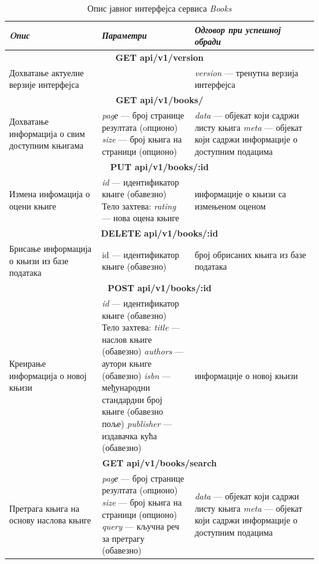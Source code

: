 \documentclass[12pt,oneside]{memoir}
\begin{document}
\begin{table}
\caption{Опис јавног интерфејса сервиса \textit{Books}}
\label{tbl:booksAPI}
\begin{tabular}{ |  p{0.3\linewidth} | p{0.3\linewidth}|  p{0.4\linewidth} | }
\hline
\textit{Oпис} & \textit{Параметри} & \textit{Одговор при успешној обради} \\
\hline
\multicolumn{3}{|c|}{\textbf{GET api/v1/version}} \\
\hline
Дохватање актуелне верзије интерфејса & & 
\textit{version} --- тренутна верзија интерфејса \\
\hline
\multicolumn{3}{|c|}{\textbf{GET api/v1/books/}} \\
\hline
Дохватање информација о свим доступним књигама & 
\textit{pagе} --- број странице резултата (oпционо) \newline 
\textit{size} --- број књига на страници (опционо)
& 
\textit{data} --- објекат који садржи листу књига \newline
\textit{meta} --- објекат који садржи информације о доступним подацима \\
\hline
\multicolumn{3}{|c|}{\textbf{PUT api/v1/books/:id}} \\
\hline
Измена инфомација о оцени књиге & 
\textit{id} --- идентификатор књиге (обавезно) \newline 
Тело захтева: \newline
\textit{rating} --- нова оцена књиге
& 
информације о књизи са измењеном оценом\\
\hline
\multicolumn{3}{|c|}{\textbf{DELETE api/v1/books/:id}} \\
\hline
Брисање информација о књизи из базе података & 
{id} --- идентификатор књиге (обавезно)
& 
број обрисаних књига из базе података \\
\hline
\multicolumn{3}{|c|}{\textbf{POST api/v1/books/:id}} \\
\hline
Креирање информација о новој књизи &
\textit{id} --- идентификатор књиге (обавезно) \newline 
Тело захтева:\newline
\textit{title}  --- наслов књиге (обавезно) \newline
\textit{authors} --- аутори књиге (обавезно)  \newline
\textit{isbn} --- међународни стандардни број књиге (обавезно поље) \newline
\textit{publisher} --- издавачка кућа (обавезно) 
& 
информације о новој књизи\\
\hline
\multicolumn{3}{|c|}{\textbf{GET api/v1/books/search}} \\
\hline
Претрага књига на основу наслова књиге &
\textit{pagе} --- број странице резултата (oпционо) \newline 
\textit{size} --- број књига на страници (опционо) \newline 
\textit{query} --- кључна реч за претрагу (обавезно) 
  & 
\textit{data} --- објекат који садржи листу књига \newline
\textit{meta} --- објекат који садржи информације о доступним подацима \\
\hline
\end{tabular}
\end{table}
\end{document}
